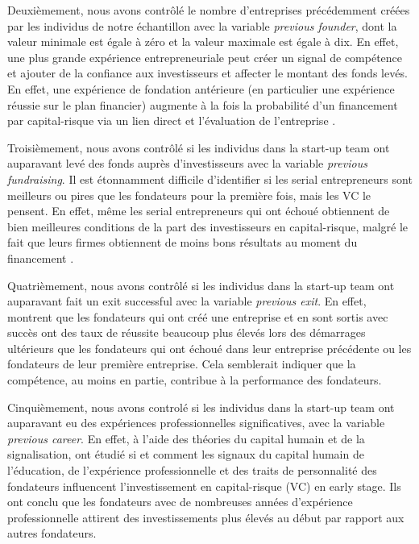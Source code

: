 \documentclass[12pt]{article}
\begin{document}
Deuxièmement, nous avons contrôlé le nombre d'entreprises précédemment créées par les individus de notre échantillon avec la variable \textit{previous founder}, dont la valeur minimale est égale à zéro et la valeur maximale est égale à dix. En effet, une plus grande expérience entrepreneuriale peut créer un signal de compétence et ajouter de la confiance aux investisseurs et affecter le montant des fonds levés. En effet, une expérience de fondation antérieure (en particulier une expérience réussie sur le plan financier) augmente à la fois la probabilité d'un financement par capital-risque via un lien direct et l'évaluation de l'entreprise \citep{hsu2007experienced}.

Troisièmement, nous avons contrôlé si les individus dans la start-up team ont auparavant levé des fonds auprès d'investisseurs avec la variable \textit{previous fundraising}. Il est étonnamment difficile d'identifier si les serial entrepreneurs sont meilleurs ou pires que les fondateurs pour la première fois, mais les VC le pensent. En effet, même les serial entrepreneurs qui ont échoué obtiennent de bien meilleures conditions de la part des investisseurs en capital-risque, malgré le fait que leurs firmes obtiennent de moins bons résultats au moment du financement \citep{nahata2019success}.

Quatrièmement, nous avons contrôlé si les individus dans la start-up team ont auparavant fait un exit successful avec la variable \textit{previous exit}. En effet, \citet{gompers2010performance} montrent que les fondateurs qui ont créé une entreprise et en sont sortis avec succès ont des taux de réussite beaucoup plus élevés lors des démarrages ultérieurs que les fondateurs qui ont échoué dans leur entreprise précédente ou les fondateurs de leur première entreprise. Cela semblerait indiquer que la compétence, au moins en partie, contribue à la performance des fondateurs.

Cinquièmement, nous avons controlé si les individus dans la start-up team ont auparavant eu des expériences professionnelles significatives, avec la variable \textit{previous career}. En effet, à l'aide des théories du capital humain et de la signalisation, \citet{subramanian2022backing} ont étudié si et comment les signaux du capital humain de l'éducation, de l'expérience professionnelle et des traits de personnalité des fondateurs influencent l'investissement en capital-risque (VC) en early stage. Ils ont conclu que les fondateurs avec de nombreuses années d'expérience professionnelle attirent des investissements plus élevés au début par rapport aux autres fondateurs.
\end{document}
